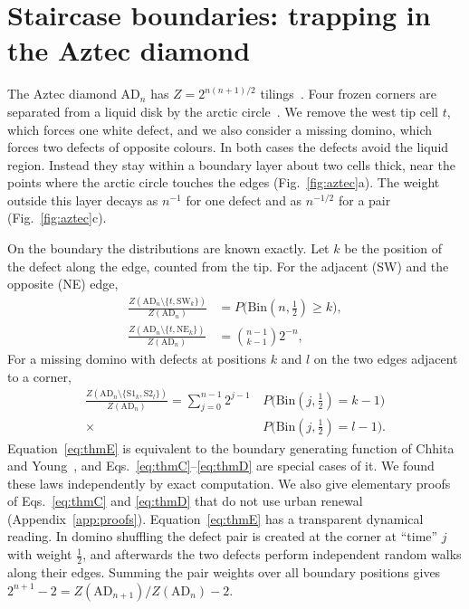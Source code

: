 \documentclass[aps,pre,twocolumn,superscriptaddress,nofootinbib,floatfix]{revtex4-2}
\newcommand{\AD}{\mathrm{AD}}
\newcommand{\Bin}{\mathrm{Bin}}
\begin{document}
\section{Staircase boundaries: trapping in the Aztec diamond}
\label{sec:aztec}

The Aztec diamond $\AD_n$ has $Z=2^{n(n+1)/2}$ tilings~\cite{EKLP1992}. Four frozen corners are separated from a liquid disk by the arctic circle~\cite{JockuschProppShor1998}. We remove the west tip cell $t$, which forces one white defect, and we also consider a missing domino, which forces two defects of opposite colours. In both cases the defects avoid the liquid region. Instead they stay within a boundary layer about two cells thick, near the points where the arctic circle touches the edges (Fig.~\ref{fig:aztec}a). The weight outside this layer decays as $n^{-1}$ for one defect and as $n^{-1/2}$ for a pair (Fig.~\ref{fig:aztec}c).

On the boundary the distributions are known exactly. Let $k$ be the position of the defect along the edge, counted from the tip. For the adjacent (SW) and the opposite (NE) edge,
\begin{align}
\frac{Z(\AD_n\setminus\{t,\mathrm{SW}_k\})}{Z(\AD_n)}&=P\bigl(\Bin(n,\tfrac12)\ge k\bigr),\label{eq:thmC}\\
\frac{Z(\AD_n\setminus\{t,\mathrm{NE}_k\})}{Z(\AD_n)}&=\binom{n-1}{k-1}2^{-n},\label{eq:thmD}
\end{align}
For a missing domino with defects at positions $k$ and $l$ on the two edges adjacent to a corner,
\begin{equation}
\begin{split}\frac{Z(\AD_n\setminus\{\mathrm{S1}_k,\mathrm{S2}_l\})}{Z(\AD_n)}=\sum_{j=0}^{n-1}2^{j-1}&\,P\bigl(\Bin(j,\tfrac12)=k-1\bigr)\\\times&\,P\bigl(\Bin(j,\tfrac12)=l-1\bigr).\end{split}
\label{eq:thmE}
\end{equation}
Equation~\eqref{eq:thmE} is equivalent to the boundary generating function of Chhita and Young~\cite{ChhitaYoung2014}, and Eqs.~\eqref{eq:thmC}--\eqref{eq:thmD} are special cases of it. We found these laws independently by exact computation. We also give elementary proofs of Eqs.~\eqref{eq:thmC} and \eqref{eq:thmD} that do not use urban renewal (Appendix~\ref{app:proofs}). Equation~\eqref{eq:thmE} has a transparent dynamical reading. In domino shuffling the defect pair is created at the corner at ``time'' $j$ with weight $\tfrac12$, and afterwards the two defects perform independent random walks along their edges. Summing the pair weights over all boundary positions gives $2^{n+1}-2=Z(\AD_{n+1})/Z(\AD_n)-2$.
\end{document}

